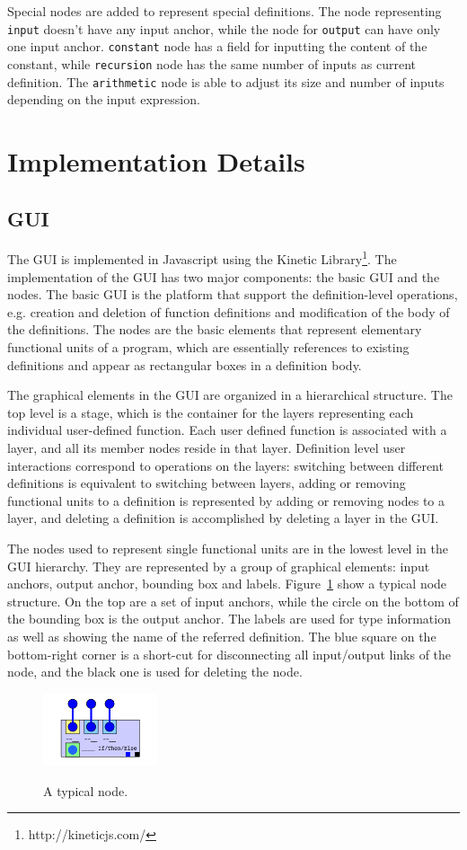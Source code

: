 \documentclass[12pt,UTF8,a4]{article}
\newcommand{\code}[1]{\texttt{#1}}
\begin{document}
Special nodes are added to represent special definitions. The node representing \code{input} doesn't have any input anchor, while the node for \code{output} can have only one input anchor. \code{constant} node has a field for inputting the content of the constant, while \code{recursion} node has the same number of inputs as current definition. The \code{arithmetic} node is able to adjust its size and number of inputs depending on the input expression.

\section{Implementation Details}
\subsection{GUI}
The GUI is implemented in Javascript using the Kinetic Library\footnote{http://kineticjs.com/}. The implementation of the GUI has two major components: the basic GUI and the nodes. The basic GUI is the platform that support the definition-level operations, e.g. creation and deletion of function definitions and modification of the body of the definitions. The nodes are the basic elements that represent elementary functional units of a program, which are essentially references to existing definitions and appear as rectangular boxes in a definition body. 

The graphical elements in the GUI are organized in a hierarchical structure. The top level is a stage, which is the container for the layers representing each individual user-defined function. Each user defined function is associated with a layer, and all its member nodes reside in that layer. Definition level user interactions correspond to operations on the layers: switching between different definitions is equivalent to switching between layers, adding or removing functional units to a definition is represented by adding or removing nodes to a layer, and deleting a definition is accomplished by deleting a layer in the GUI.

The nodes used to represent single functional units are in the lowest level in the GUI hierarchy. They are represented by a group of graphical elements: input anchors, output anchor, bounding box and labels. Figure~\ref{fig:node} show a typical node structure. On the top are a set of input anchors, while the circle on the bottom of the bounding box is the output anchor. The labels are used for type information as well as showing the name of the referred definition. The blue square on the bottom-right corner is a short-cut for disconnecting all input/output links of the node, and the black one is used for deleting the node.
\begin{figure}[!ht]
\center
\includegraphics[width=0.3\textwidth]{./images/node} \\
\caption{A typical node.}\label{fig:node}
\end{figure}
\end{document}
